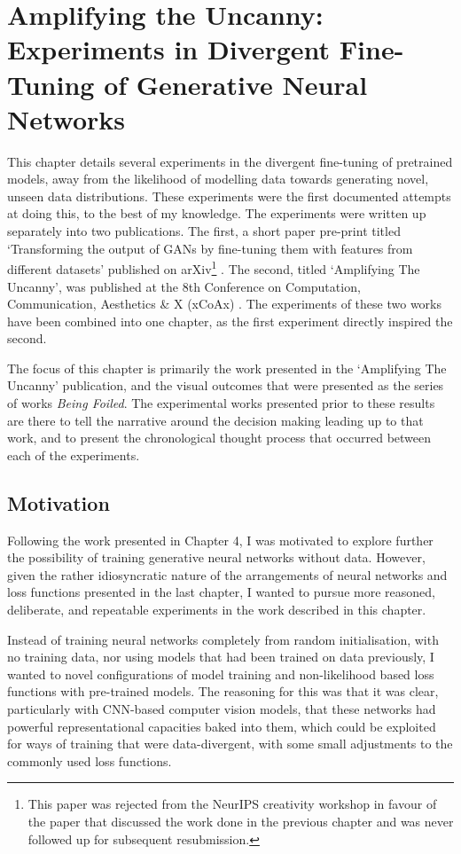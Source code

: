 \chapter{Amplifying the Uncanny: Experiments in Divergent Fine-Tuning of Generative Neural Networks}
\label{ch:uncanny}

This chapter details several experiments in the divergent fine-tuning of pretrained models, away from the likelihood of modelling data towards generating novel, unseen data distributions. 
These experiments were the first documented attempts at doing this, to the best of my knowledge. 
The experiments were written up separately into two publications. 
The first, a short paper pre-print titled `Transforming the output of GANs by fine-tuning them with features from different datasets’ published on arXiv\footnote{
    This paper was rejected from the NeurIPS creativity workshop in favour of the paper that discussed the work done in the previous chapter \citep{broad2019searching} and was never followed up for subsequent resubmission.} \citep{broad2019transforming}. 
The second, titled `Amplifying The Uncanny’, was published at the 8th Conference on Computation, Communication, Aesthetics \& X (xCoAx) \citep{broad2020amplifying}. 
The experiments of these two works have been combined into one chapter, as the first experiment directly inspired the second.

The focus of this chapter is primarily the work presented in the `Amplifying The Uncanny’ publication, and the visual outcomes that were presented as the series of works \textit{Being Foiled}. 
The experimental works presented prior to these results are there to tell the narrative around the decision making leading up to that work, and to present the chronological thought process that occurred between each of the experiments. 

\section{Motivation}

Following the work presented in Chapter 4, I was motivated to explore further the possibility of training generative neural networks without data. 
However, given the rather idiosyncratic nature of the arrangements of neural networks and loss functions presented in the last chapter, I wanted to pursue more reasoned, deliberate, and repeatable experiments in the work described in this chapter. 

Instead of training neural networks completely from random initialisation, with no training data, nor using models that had been trained on data previously, I wanted to novel configurations of model training and non-likelihood based loss functions with pre-trained models. 
The reasoning for this was that it was clear, particularly with CNN-based computer vision models, that these networks had powerful representational capacities baked into them, which could be exploited for ways of training that were data-divergent, with some small adjustments to the commonly used loss functions. 

